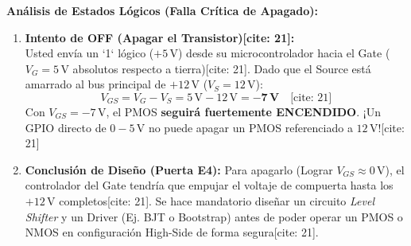 \documentclass[11pt, a4paper]{article}
\begin{document}
\vspace{0.4cm}
\textbf{Análisis de Estados Lógicos (Falla Crítica de Apagado):}
\begin{enumerate}
    \item \textbf{Intento de OFF (Apagar el Transistor)[cite: 21]:} \\
    Usted envía un `1` lógico ($+5\,\text{V}$) desde su microcontrolador hacia el Gate ($V_G = 5\,\text{V}$ absolutos respecto a tierra)[cite: 21]. 
    Dado que el Source está amarrado al bus principal de $+12\,\text{V}$ ($V_S = 12\,\text{V}$):
    \begin{equation*}
        V_{GS} = V_G - V_S = 5\,\text{V} - 12\,\text{V} = \mathbf{-7\,\text{V}} \quad \text{[cite: 21]}
    \end{equation*}
    Con $V_{GS} = -7\,\text{V}$, el PMOS \textbf{seguirá fuertemente ENCENDIDO}. ¡Un GPIO directo de $0-5\,\text{V}$ no puede apagar un PMOS referenciado a $12\,\text{V}$![cite: 21] 
    
    \item \textbf{Conclusión de Diseño (Puerta E4):} Para apagarlo (Lograr $V_{GS} \approx 0\,\text{V}$), el controlador del Gate tendría que empujar el voltaje de compuerta hasta los $+12\,\text{V}$ completos[cite: 21]. Se hace mandatorio diseñar un circuito \textit{Level Shifter} y un Driver (Ej. BJT o Bootstrap) antes de poder operar un PMOS o NMOS en configuración High-Side de forma segura[cite: 21].
\end{enumerate}
\end{document}
